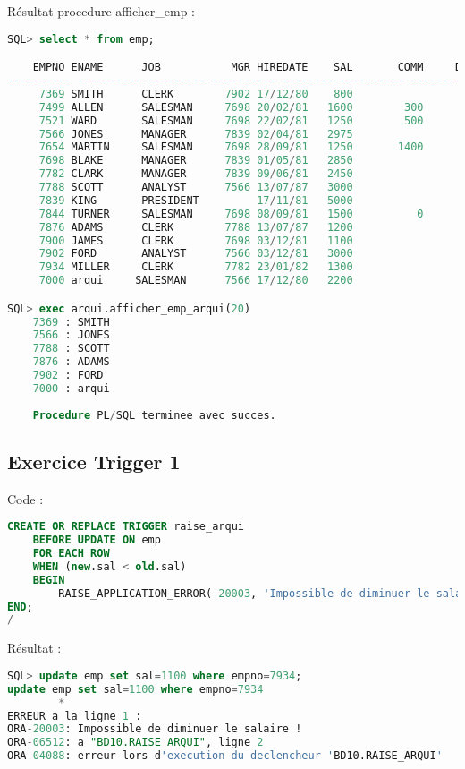 \documentclass{article}
\begin{document}
\newpage
Résultat procedure afficher\_emp :
\begin{lstlisting}[language=SQL,
    morekeywords={DECLARE, LOOP, TYPE, FOR, IF, IS, OPEN, FETCH, DBMS_OUTPUT, PUT_LINE}]
SQL> select * from emp;

    EMPNO ENAME      JOB	       MGR HIREDATE	   SAL	     COMM     DEPTNO
---------- ---------- --------- ---------- -------- ---------- ---------- ----------
     7369 SMITH      CLERK	      7902 17/12/80	   800			            20
     7499 ALLEN      SALESMAN	  7698 20/02/81	  1600	      300	        30
     7521 WARD       SALESMAN	  7698 22/02/81	  1250	      500	        30
     7566 JONES      MANAGER	  7839 02/04/81	  2975			            20
     7654 MARTIN     SALESMAN	  7698 28/09/81	  1250	     1400	        30
     7698 BLAKE      MANAGER	  7839 01/05/81	  2850			            30
     7782 CLARK      MANAGER	  7839 09/06/81	  2450			            10
     7788 SCOTT      ANALYST	  7566 13/07/87	  3000			            20
     7839 KING       PRESIDENT 	       17/11/81	  5000			            10
     7844 TURNER     SALESMAN	  7698 08/09/81	  1500		    0           30
     7876 ADAMS      CLERK	      7788 13/07/87	  1200			            20
     7900 JAMES      CLERK	      7698 03/12/81	  1100			            30
     7902 FORD       ANALYST	  7566 03/12/81	  3000			            20
     7934 MILLER     CLERK	      7782 23/01/82	  1300			            10
     7000 arqui     SALESMAN	  7566 17/12/80	  2200			            20

SQL> exec arqui.afficher_emp_arqui(20)
    7369 : SMITH
    7566 : JONES
    7788 : SCOTT
    7876 : ADAMS
    7902 : FORD
    7000 : arqui
    
    Procedure PL/SQL terminee avec succes.
\end{lstlisting}


\subsection{Exercice Trigger 1}
Code :
\begin{lstlisting}[language=SQL,
    deletekeywords={char},
    morekeywords={DECLARE, LOOP, TYPE, FOR, IF, IS, OPEN, FETCH, DBMS_OUTPUT, PUT_LINE}]
CREATE OR REPLACE TRIGGER raise_arqui
	BEFORE UPDATE ON emp
	FOR EACH ROW
	WHEN (new.sal < old.sal)
	BEGIN
		RAISE_APPLICATION_ERROR(-20003, 'Impossible de diminuer le salaire !');
END;
/
\end{lstlisting}

Résultat :
\begin{lstlisting}[language=SQL,
    morekeywords={DECLARE, LOOP, TYPE, FOR, IF, IS, OPEN, FETCH, DBMS_OUTPUT, PUT_LINE}]
SQL> update emp set sal=1100 where empno=7934;
update emp set sal=1100 where empno=7934
        *
ERREUR a la ligne 1 :
ORA-20003: Impossible de diminuer le salaire !
ORA-06512: a "BD10.RAISE_ARQUI", ligne 2
ORA-04088: erreur lors d'execution du declencheur 'BD10.RAISE_ARQUI'
\end{lstlisting}
\end{document}
